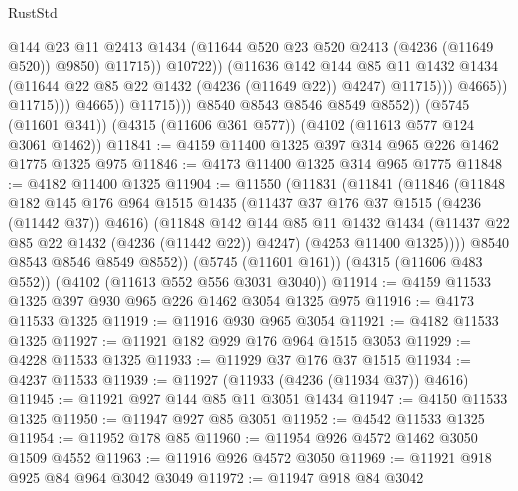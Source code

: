 \begin{lexlean}{RustStd}
\begin{coremodule}
                                        @144
                                        @23
                                        @11
                                        @2413
                                        @1434
                                        (@11644 @520 @23 @520 @2413 (@4236 (@11649 @520)) @9850)
                                        @11715))
                                    @10722))
                                (@11636
                                  @142
                                  @144
                                  @85
                                  @11
                                  @1432
                                  @1434
                                  (@11644 @22 @85 @22 @1432 (@4236 (@11649 @22)) @4247)
                                  @11715)))
                            @4665))
                        @11715)))
                  @4665))
              @11715)))
        @8540
        @8543
        @8546
        @8549
        @8552))
    (@5745 (@11601 @341))
    (@4315 (@11606 @361 @577))
    (@4102 (@11613 @577 @124 @3061 @1462))
@11841 := @4159 @11400 @1325 @397 @314 @965 @226 @1462 @1775 @1325 @975
@11846 := @4173 @11400 @1325 @314 @965 @1775
@11848 := @4182 @11400 @1325
@11904 := @11550
    (@11831
      (@11841
        (@11846
          (@11848
            @182
            @145
            @176
            @964
            @1515
            @1435
            (@11437 @37 @176 @37 @1515 (@4236 (@11442 @37)) @4616)
            (@11848
              @142
              @144
              @85
              @11
              @1432
              @1434
              (@11437 @22 @85 @22 @1432 (@4236 (@11442 @22)) @4247)
              (@4253 @11400 @1325))))
        @8540
        @8543
        @8546
        @8549
        @8552))
    (@5745 (@11601 @161))
    (@4315 (@11606 @483 @552))
    (@4102 (@11613 @552 @556 @3031 @3040))
@11914 := @4159 @11533 @1325 @397 @930 @965 @226 @1462 @3054 @1325 @975
@11916 := @4173 @11533 @1325
@11919 := @11916 @930 @965 @3054
@11921 := @4182 @11533 @1325
@11927 := @11921 @182 @929 @176 @964 @1515 @3053
@11929 := @4228 @11533 @1325
@11933 := @11929 @37 @176 @37 @1515
@11934 := @4237 @11533
@11939 := @11927 (@11933 (@4236 (@11934 @37)) @4616)
@11945 := @11921 @927 @144 @85 @11 @3051 @1434
@11947 := @4150 @11533 @1325
@11950 := @11947 @927 @85 @3051
@11952 := @4542 @11533 @1325
@11954 := @11952 @178 @85
@11960 := @11954 @926 @4572 @1462 @3050 @1509 @4552
@11963 := @11916 @926 @4572 @3050
@11969 := @11921 @918 @925 @84 @964 @3042 @3049
@11972 := @11947 @918 @84 @3042

\end{coremodule}
\end{lexlean}
